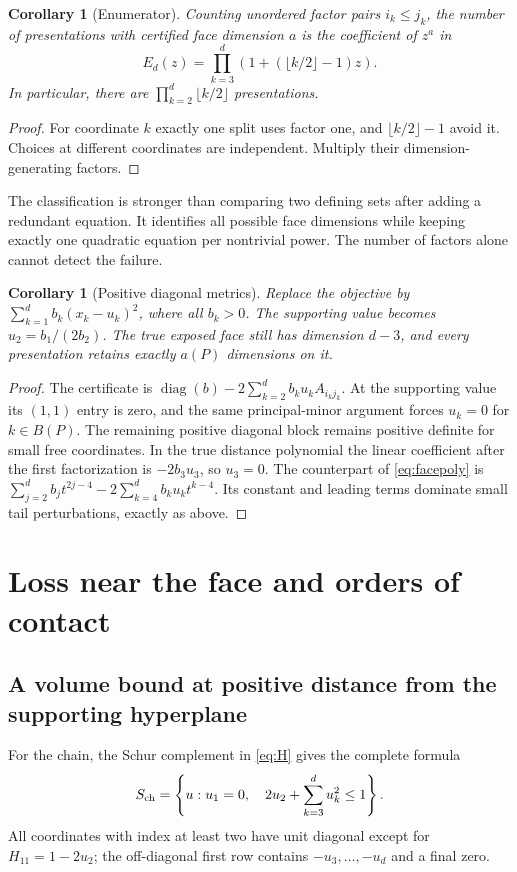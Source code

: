 \documentclass[11pt]{article}
\newtheorem{corollary}[theorem]{Corollary}
\theoremstyle{definition}\newtheorem{definition}[theorem]{Definition}
\theoremstyle{remark}\newtheorem{remark}[theorem]{Remark}
\newcommand{\diag}{\operatorname{diag}}
\begin{document}
\begin{corollary}[Enumerator]\label{cor:enumerator}
Counting unordered factor pairs $i_k\le j_k$, the number of presentations with certified face dimension $a$ is the coefficient of $z^a$ in
\begin{equation}\label{eq:enumerator}
 E_d(z)=\prod_{k=3}^d\left(1+(\lfloor k/2\rfloor-1)z\right).
\end{equation}
In particular, there are $\prod_{k=2}^d\lfloor k/2\rfloor$ presentations.
\end{corollary}
\begin{proof}
For coordinate $k$ exactly one split uses factor one, and $\lfloor k/2\rfloor-1$ avoid it. Choices at different coordinates are independent. Multiply their dimension-generating factors.
\end{proof}

The classification is stronger than comparing two defining sets after adding a redundant equation. It identifies all possible face dimensions while keeping exactly one quadratic equation per nontrivial power. The number of factors alone cannot detect the failure.

\begin{corollary}[Positive diagonal metrics]\label{cor:weighted}
Replace the objective by $\sum_{k=1}^d b_k(x_k-u_k)^2$, where all $b_k>0$. The supporting value becomes $u_2=b_1/(2b_2)$. The true exposed face still has dimension $d-3$, and every presentation retains exactly $a(P)$ dimensions on it.
\end{corollary}
\begin{proof}
The certificate is $\diag(b)-2\sum_{k=2}^d b_ku_kA_{i_kj_k}$. At the supporting value its $(1,1)$ entry is zero, and the same principal-minor argument forces $u_k=0$ for $k\in B(P)$. The remaining positive diagonal block remains positive definite for small free coordinates. In the true distance polynomial the linear coefficient after the first factorization is $-2b_3u_3$, so $u_3=0$. The counterpart of \eqref{eq:facepoly} is $\sum_{j=2}^d b_jt^{2j-4}-2\sum_{k=4}^d b_ku_kt^{k-4}$. Its constant and leading terms dominate small tail perturbations, exactly as above.
\end{proof}

\section{Loss near the face and orders of contact}\label{sec:contact}
\subsection{A volume bound at positive distance from the supporting hyperplane}
For the chain, the Schur complement in \eqref{eq:H} gives the complete formula
\begin{equation}\label{eq:chain}
 S_{\rm ch}=\left\{u:u_1=0,\quad 2u_2+\sum_{k=3}^d u_k^2\le1\right\}.
\end{equation}
All coordinates with index at least two have unit diagonal except for $H_{11}=1-2u_2$; the off-diagonal first row contains $-u_3,\ldots,-u_d$ and a final zero.
\end{document}
